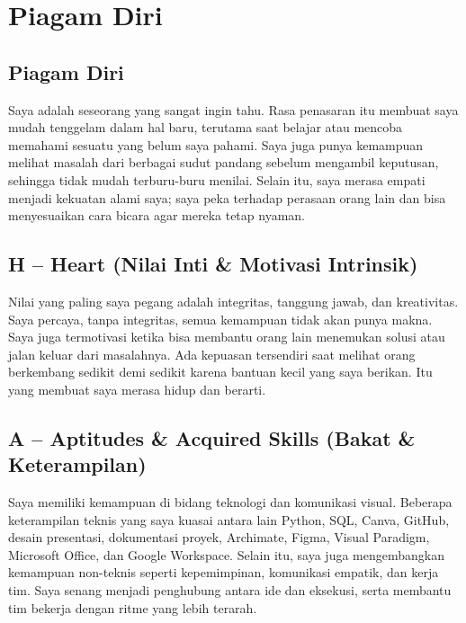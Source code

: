\documentclass[
  letterpaper,
  DIV=11,
  numbers=noendperiod]{scrreprt}
\begin{document}
\section{Piagam Diri}\label{piagam-diri}

\subsection{Piagam Diri}\label{piagam-diri-1}

Saya adalah seseorang yang sangat ingin tahu. Rasa penasaran itu membuat
saya mudah tenggelam dalam hal baru, terutama saat belajar atau mencoba
memahami sesuatu yang belum saya pahami. Saya juga punya kemampuan
melihat masalah dari berbagai sudut pandang sebelum mengambil keputusan,
sehingga tidak mudah terburu-buru menilai. Selain itu, saya merasa
empati menjadi kekuatan alami saya; saya peka terhadap perasaan orang
lain dan bisa menyesuaikan cara bicara agar mereka tetap nyaman.

\subsection{H -- Heart (Nilai Inti \& Motivasi
Intrinsik)}\label{h-heart-nilai-inti-motivasi-intrinsik}

Nilai yang paling saya pegang adalah integritas, tanggung jawab, dan
kreativitas. Saya percaya, tanpa integritas, semua kemampuan tidak akan
punya makna. Saya juga termotivasi ketika bisa membantu orang lain
menemukan solusi atau jalan keluar dari masalahnya. Ada kepuasan
tersendiri saat melihat orang berkembang sedikit demi sedikit karena
bantuan kecil yang saya berikan. Itu yang membuat saya merasa hidup dan
berarti.

\subsection{A -- Aptitudes \& Acquired Skills (Bakat \&
Keterampilan)}\label{a-aptitudes-acquired-skills-bakat-keterampilan}

Saya memiliki kemampuan di bidang teknologi dan komunikasi visual.
Beberapa keterampilan teknis yang saya kuasai antara lain Python, SQL,
Canva, GitHub, desain presentasi, dokumentasi proyek, Archimate, Figma,
Visual Paradigm, Microsoft Office, dan Google Workspace. Selain itu,
saya juga mengembangkan kemampuan non-teknis seperti kepemimpinan,
komunikasi empatik, dan kerja tim. Saya senang menjadi penghubung antara
ide dan eksekusi, serta membantu tim bekerja dengan ritme yang lebih
terarah.
\end{document}
